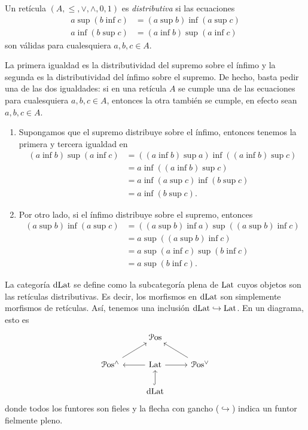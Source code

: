 \begin{definition}\label{distri}
  

Un retícula $(A,\leq, \vee,\wedge,0,1)$ es \emph{ distributiva } si las ecuaciones
\begin{align*}
  a\sup(b\inf c) &= (a\sup b)\inf (a\sup c) \\
  a\inf(b\sup c) &= (a\inf b)\sup(a\inf c)
\end{align*}
son válidas para cualesquiera $a,b,c\in A$.
\end{definition}
La primera igualdad es la distributividad del supremo sobre el
ínfimo y la segunda es la distributividad del ínfimo sobre el
supremo.
De hecho, basta pedir una de las dos igualdades:
si en una retícula $A$ se cumple una de las ecuaciones para
cualesquiera $a,b,c\in A$, entonces la otra también se cumple, en efecto
sean $a,b,c\in A$.
    \begin{enumerate}
      \item
      Supongamos que el supremo distribuye sobre el ínfimo,
      entonces tenemos la primera y tercera igualdad en
      \begin{align*}
          (a\inf b)\sup(a\inf c)
          &= ((a\inf b)\sup a)\inf((a\inf b)\sup c) \\
          &= a\inf((a\inf b)\sup c) \\
          &= a\inf(a\sup c)\inf (b\sup c) \\
          &= a\inf (b\sup c).
      \end{align*}

      \item
      Por otro lado, si el ínfimo distribuye sobre el
      supremo, entonces
      \begin{align*}
          (a\sup b)\inf(a\sup c)
          &= ((a\sup b)\inf a)\sup((a\sup b)\inf c) \\
          &= a\sup((a\sup b)\inf c) \\
          &= a\sup (a\inf c)\sup (b\inf c) \\
          &= a\sup (b\inf c).
      \end{align*}
    \end{enumerate}


La categoría $\mathrm{dLat}$ se define como la subcategoría plena de
$\mathrm{Lat}$ cuyos objetos son las retículas distributivas.
Es decir, los morfismos en $\mathrm{dLat}$ son simplemente morfismos de
retículas. Así, tenemos una inclusión $\mathrm{dLat}\hookrightarrow\mathrm{Lat}$.
En un diagrama, esto es
\[
    \begin{tikzcd}
        & \Pos \\
        \Pos^\wedge \arrow[ru]
            & \Lat \arrow[r] \arrow[l]
            & \Pos^\vee \arrow[lu] \\
        & \DLat \arrow[u,hook]
    \end{tikzcd}
\]
donde todos los funtores son fieles y la flecha con gancho
($\hookrightarrow$) indica un funtor fielmente pleno.

